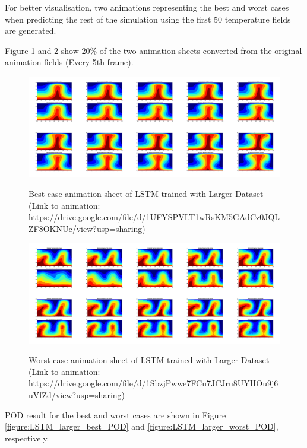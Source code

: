 For better visualisation, two animations representing the best and worst cases when predicting the rest of the simulation using the first 50 temperature fields are generated.

Figure \ref{figure:LSTM_larger_best_gif} and \ref{figure:LSTM_larger_worst_gif} show 20\% of the two animation sheets converted from the original animation fields (Every 5th frame).

\begin{figure}[H]
    \centering
    \caption{Best case animation sheet of LSTM trained with Larger Dataset (Link to animation: \url{https://drive.google.com/file/d/1UFYSPVLT1wRsKM5GAdCz0JQLZF8OKNUc/view?usp=sharing})}
    \includegraphics[scale=0.10]{figures/mantle_convection_images/larger_dataset/LSTM_Best_GIF_sheet.png}
    \label{figure:LSTM_larger_best_gif}
\end{figure}



\begin{figure}[H]
    \centering
    \caption{Worst case animation sheet of LSTM trained with Larger Dataset (Link to animation: 
    \url{https://drive.google.com/file/d/1SbzjPwwe7FCu7JCJru8UYHOu9j6uVfZd/view?usp=sharing})}
    \includegraphics[scale=0.10]{figures/mantle_convection_images/larger_dataset/LSTM_Worst_GIF_sheet.png}
    \label{figure:LSTM_larger_worst_gif}
\end{figure}

POD result for the best and worst cases are shown in Figure \ref{figure:LSTM_larger_best_POD} and \ref{figure:LSTM_larger_worst_POD}, respectively.

